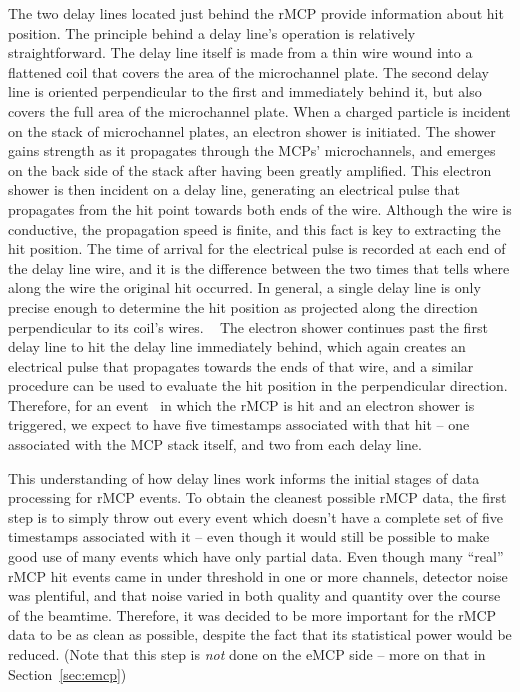 The two delay lines located just behind the rMCP provide information about hit position.  The principle behind a delay line's operation is relatively straightforward.  The delay line itself is made from a thin wire wound into a flattened coil that covers the area of the microchannel plate.  The second delay line is oriented perpendicular to the first and immediately behind it, but also covers the full area of the microchannel plate.  When a charged particle is incident on the stack of microchannel plates, an electron shower is initiated.  The shower gains strength as it propagates through the MCPs' microchannels, and emerges on the back side of the stack after having been greatly amplified.  This electron shower is then incident on a delay line, generating an electrical pulse that propagates from the hit point towards both ends of the wire.  Although the wire is conductive, the propagation speed is finite, and this fact is key to extracting the hit position.  The time of arrival for the electrical pulse is recorded at each end of the delay line wire, and it is the difference between the two times that tells where along the wire the original hit occurred.  In general, a single delay line is only precise enough to determine the hit position as projected along the direction perpendicular to its coil's wires.
~ 
The electron shower continues past the first delay line to hit the delay line immediately behind, which again creates an electrical pulse that propagates towards the ends of that wire, and a similar procedure can be used to evaluate the hit position in the perpendicular direction.  Therefore, for an event~ in which the rMCP is hit and an electron shower is triggered, we expect to have five timestamps associated with that hit -- one associated with the MCP stack itself, and two from each delay line.

This understanding of how delay lines work informs the initial stages of data processing for rMCP events.  To obtain the cleanest possible rMCP data, the first step is to simply throw out every event which doesn't have a complete set of five timestamps associated with it -- even though it would still be possible to make good use of many events which have only partial data.  Even though many ``real'' rMCP hit events came in under threshold in one or more channels, detector noise was plentiful, 
and that noise varied in both quality and quantity over the course of the beamtime.  Therefore, it was decided to be more important for the rMCP data to be as clean as possible, despite the fact that its statistical power would be reduced. (Note that this step is \emph{not} done on the eMCP side -- more on that in Section~\ref{sec:emcp})~  

